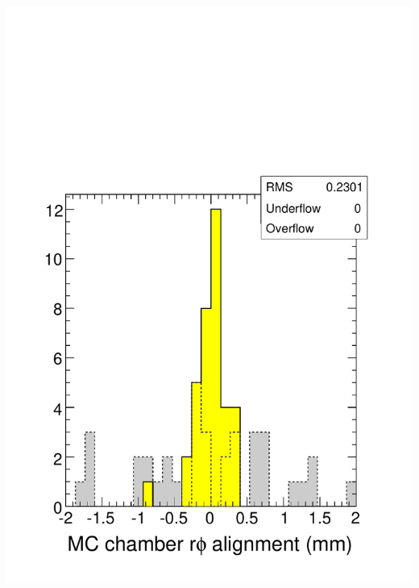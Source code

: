 \documentclass[compress]{beamer}
\begin{document}
\begin{frame}
\begin{columns}
\includegraphics[width=\linewidth]{mcchamber_rphi.pdf}

\end{columns}
\end{frame}
\end{document}
